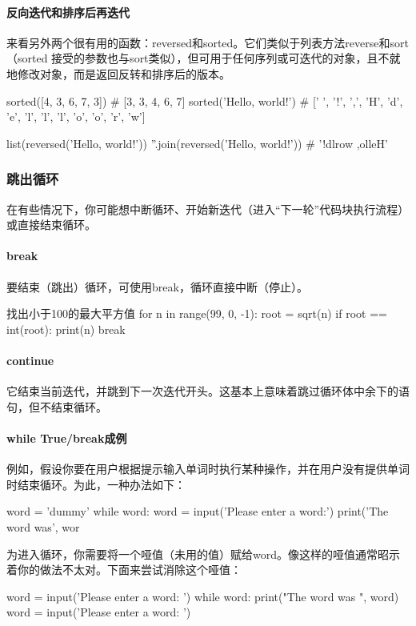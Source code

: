 \paragraph{反向迭代和排序后再迭代} 来看另外两个很有用的函数：reversed和sorted。它们类似于列表方法reverse和sort（sorted 接受的参数也与sort类似），但可用于任何序列或可迭代的对象，且不就地修改对象，而是返回反转和排序后的版本。
\begin{pyc}
sorted([4, 3, 6, 7, 3])  # [3, 3, 4, 6, 7]
sorted('Hello, world!')
# [' ', '!', ',', 'H', 'd', 'e', 'l', 'l', 'l', 'o', 'o', 'r', 'w']

list(reversed('Hello, world!'))
''.join(reversed('Hello, world!'))  # '!dlrow ,olleH'
\end{pyc}


\subsubsection{跳出循环}
在有些情况下，你可能想中断循环、开始新迭代（进入“下一轮”代码块执行流程）或直接结束循环。
\paragraph{break} 要结束（跳出）循环，可使用break，循环直接中断（停止）。
\begin{py}{找出小于100的最大平方值}
for n in range(99, 0, -1):
root = sqrt(n)
if root == int(root):
    print(n)
    break
\end{py}
\paragraph{continue} 它结束当前迭代，并跳到下一次迭代开头。这基本上意味着跳过循环体中余下的语句，但不结束循环。
\paragraph{while True/break成例} 例如，假设你要在用户根据提示输入单词时执行某种操作，并在用户没有提供单词时结束循环。为此，一种办法如下：
\begin{pyc}
word = 'dummy'
while word:
    word = input('Please enter a word:')
    print('The word was', wor
\end{pyc}
为进入循环，你需要将一个哑值（未用的值）赋给word。像这样的哑值通常昭示着你的做法不太对。下面来尝试消除这个哑值：
\begin{pyc}
word = input('Please enter a word: ')
while word:
    print("The word was ", word)
    word = input('Please enter a word: ')
\end{pyc}

